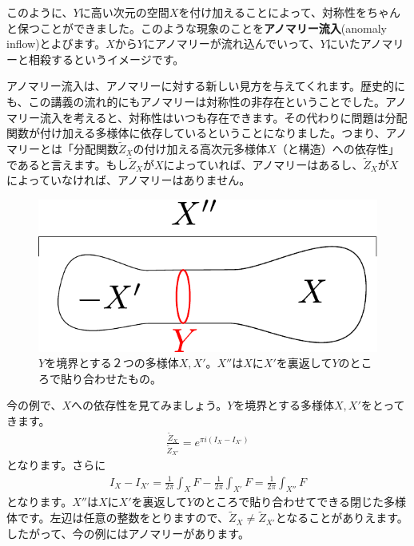 \documentclass[paper=a4, fontsize=12pt, line_length=16cm, number_of_lines=33,dvipdfmx]{jlreq}
\numberwithin{equation}{section}
\newcommand{\strong}[1]{\textsf{\bfseries #1}}
\newcommand{\Zt}{\widetilde{Z}}
\begin{document}
このように、$Y$に高い次元の空間$X$を付け加えることによって、対称性をちゃんと保つことができました。このような現象のことを\strong{アノマリー流入}(anomaly inflow)とよびます。$X$から$Y$にアノマリーが流れ込んでいって、$Y$にいたアノマリーと相殺するというイメージです。

アノマリー流入は、アノマリーに対する新しい見方を与えてくれます。歴史的にも、この講義の流れ的にもアノマリーは対称性の非存在ということでした。アノマリー流入を考えると、対称性はいつも存在できます。その代わりに問題は分配関数が付け加える多様体に依存しているということになりました。つまり、アノマリーとは「分配関数$\Zt_X$の付け加える高次元多様体$X$（と構造）への依存性」であると言えます。もし$\Zt_X$が$X$によっていれば、アノマリーはあるし、$\Zt_X$が$X$によっていなければ、アノマリーはありません。

\begin{figure}[htbp]
  \centering
  \includegraphics{inflowdifference.pdf}
  \caption{$Y$を境界とする２つの多様体$X,X'$。$X''$は$X$に$X'$を裏返して$Y$のところで貼り合わせたもの。}
  \label{fig:inflowdifference}
\end{figure}
今の例で、$X$への依存性を見てみましょう。$Y$を境界とする多様体$X,X'$をとってきます。
\begin{align}
  \frac{\Zt_{X}}{\Zt_{X'}}=e^{\pi i(I_{X}-I_{X'})}
\end{align}
となります。さらに
\begin{align}
  I_{X}-I_{X'}=\frac{1}{2\pi} \int_X F-\frac{1}{2\pi} \int_{X'} F=\frac{1}{2\pi} \int_{X''}F
\end{align}
となります。$X''$は$X$に$X'$を裏返して$Y$のところで貼り合わせてできる閉じた多様体です。左辺は任意の整数をとりますので、$\Zt_{X}\ne \Zt_{X'}$となることがありえます。したがって、今の例にはアノマリーがあります。
\end{document}

